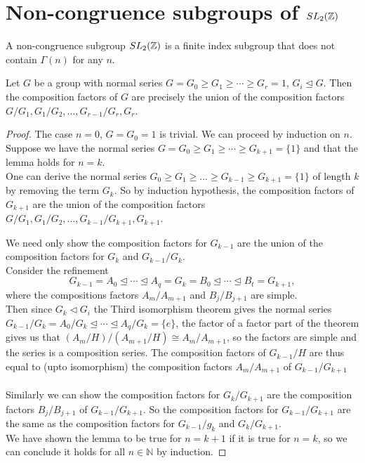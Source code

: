 



\chapter{Non-congruence subgroups of $SL_2(\mathbb{Z})$}

\begin{definition}
A non-congruence subgroup $SL_2(\mathbb{Z})$ is a finite index subgroup that does not contain $\Gamma(n)$ for any $n$.
\end{definition}

\begin{lemma}\label{lem:compositionFactorsSeries}
Let $G$ be a group with normal series $G = G_0 \geq G_1 \geq \cdots \geq G_r = {1}$, $G_i \trianglelefteq G$. Then the composition factors of $G$ are precisely the union of the composition factors $G / G_1 , G_1 / G_2, \ldots, G_{r-1}/G_r , G_r$.    
\end{lemma}
\begin{proof}
The case $n=0$, $G = G_0 = {1}$ is trivial. We can proceed by induction on $n$. \\
Suppose we have the normal series $G = G_0 \geq G_1 \geq \cdots \geq G_{k+1} = \{1\}$ and that the lemma holds for $n = k$. \\
One can derive the normal series $G_0 \geq G_1 \geq ... \geq G_{k-1} \geq G_{k+1}=\{1\}$ of length $k$ by removing the term $G_k$. So by induction hypothesis, the composition factors of $G_{k+1}$ are the union of the composition factors $G / G_1 , G_1 / G_2, \ldots, G_{k-1}/G_{k+1} , G_{k+1}$. 


We need only show the composition factors for $G_{k-1}$ are the union of the composition factors for $G_k$ and $G_{k-1}/ G_{k}$.\\ 
Consider the refinement 
$$G_{k-1} = A_0 \trianglelefteq \cdots \trianglelefteq A_q = G_k= B_0 \trianglelefteq \cdots \trianglelefteq B_t = G_{k+1 },$$
where the compositions factors $A_{m}/A_{m+1}$ and $B_{j}/B_{j+1}$ are simple. \\
Then since $G_k \triangleleft G_i$ the Third isomorphism theorem gives the normal series $G_{k-1} / G_k = A_0 / G_k\trianglelefteq \cdots \trianglelefteq A_q / G_k = \{e\}$, the factor of a factor part of the theorem gives us that $(A_{m}/H)/(A_{m+1}/H) \cong A_{m}/A_{m+1}$, so the factors are simple and the series is a composition series. The composition factors of $G_{k-1} / H$ are thus equal to (upto isomorphism) the composition factors $A_{m}/A_{m+1}$ of $G_{k-1}/G_{k+1}$  \\
\\
Similarly we can show the composition factors for $G_k/ G_{k+1}$ are the composition factors $B_{j}/B_{j+1}$ of $G_{k-1}/G_{k+1}$.
So the composition factors for $G_{k-1}/G_{k+1}$ are the same as the composition factors for $G_{k-1} / g_k$ and $G_k / G_{k+1}$. \\
We have shown the lemma to be true for $n = k+1$ if it is true for $n = k$, so we can conclude it holds for all $n \in \mathbb{N}$ by induction.
\end{proof}


